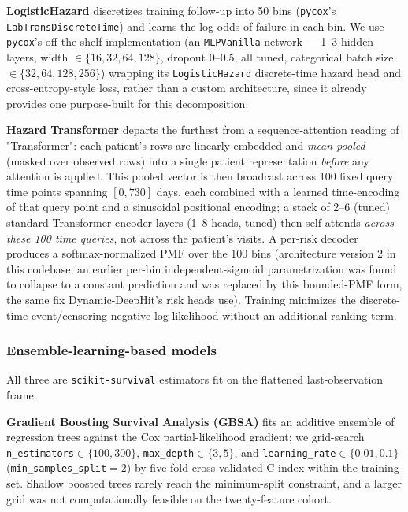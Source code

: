 \textbf{LogisticHazard} discretizes training follow-up into 50 bins (\texttt{pycox}'s \texttt{LabTransDiscreteTime}) and learns the log-odds of failure in each bin. We use \texttt{pycox}'s off-the-shelf implementation (an \texttt{MLPVanilla} network — 1--3 hidden layers, width $\in\{16,32,64,128\}$, dropout 0--0.5, all tuned, categorical batch size $\in\{32,64,128,256\}$) wrapping its \texttt{LogisticHazard} discrete-time hazard head and cross-entropy-style loss, rather than a custom architecture, since it already provides one purpose-built for this decomposition.

\textbf{Hazard Transformer} \citep{hazard_transformer,vaswani2017attention} departs the furthest from a sequence-attention reading of "Transformer": each patient's rows are linearly embedded and \emph{mean-pooled} (masked over observed rows) into a single patient representation \emph{before} any attention is applied. This pooled vector is then broadcast across 100 fixed query time points spanning $[0,730]$ days, each combined with a learned time-encoding of that query point and a sinusoidal positional encoding; a stack of 2--6 (tuned) standard Transformer encoder layers (1--8 heads, tuned) then self-attends \emph{across these 100 time queries}, not across the patient's visits. A per-risk decoder produces a softmax-normalized PMF over the 100 bins (architecture version 2 in this codebase; an earlier per-bin independent-sigmoid parametrization was found to collapse to a constant prediction and was replaced by this bounded-PMF form, the same fix Dynamic-DeepHit's risk heads use). Training minimizes the discrete-time event/censoring negative log-likelihood without an additional ranking term.

\subsubsection{Ensemble-learning-based models}
All three are \texttt{scikit-survival} \citep{polsterl2020sksurv} estimators fit on the flattened last-observation frame.

\textbf{Gradient Boosting Survival Analysis (GBSA)} \citep{chen2013gradient_GBSA} fits an additive ensemble of regression trees against the Cox partial-likelihood gradient; we grid-search \texttt{n\_estimators}$\in\{100,300\}$, \texttt{max\_depth}$\in\{3,5\}$, and \texttt{learning\_rate}$\in\{0.01,0.1\}$ (\texttt{min\_samples\_split}$=2$) by five-fold cross-validated C-index within the training set. Shallow boosted trees rarely reach the minimum-split constraint, and a larger grid was not computationally feasible on the twenty-feature cohort.

